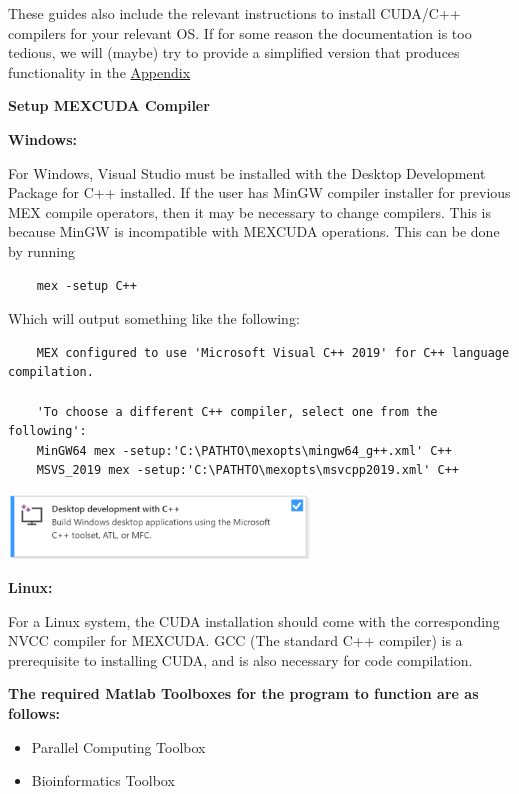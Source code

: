 \documentclass[11pt,letterpaper]{article}
\renewcommand{\\}{\bigskip}
\begin{document}
These guides also include the relevant instructions to install CUDA/C++ compilers for your relevant OS. If for some reason the documentation is too tedious, we will (maybe) try to provide a simplified version that produces functionality in the \hyperref[sec:compilerinstall]{Appendix}\\

\textbf{Setup MEXCUDA Compiler}\\

\textbf{Windows:}\\

For Windows, Visual Studio must be installed with the Desktop Development Package for C++ installed. If the user has MinGW compiler installer for previous MEX compile operators, then it may be necessary to change compilers. This is because MinGW is incompatible with MEXCUDA operations. This can be done by running

\begin{verbatim}
    mex -setup C++
\end{verbatim}

Which will output something like the following:

\begin{verbatim}
    MEX configured to use 'Microsoft Visual C++ 2019' for C++ language compilation.

    'To choose a different C++ compiler, select one from the following':
    MinGW64 mex -setup:'C:\PATHTO\mexopts\mingw64_g++.xml' C++
    MSVS_2019 mex -setup:'C:\PATHTO\mexopts\msvcpp2019.xml' C++ 
\end{verbatim}

\begin{center}
    \includegraphics[width = 0.6\textwidth]{Windows_Compiler.png}
\end{center}

\textbf{Linux:}\\

For a Linux system, the CUDA installation should come with the corresponding NVCC compiler for MEXCUDA. GCC (The standard C++ compiler) is a prerequisite to installing CUDA, and is also necessary for code compilation.

\bigskip

\textbf{The required Matlab Toolboxes for the program to function are as follows:}
\begin{itemize}
    \item Parallel Computing Toolbox
    \item Bioinformatics Toolbox
\end{itemize}
\end{document}
